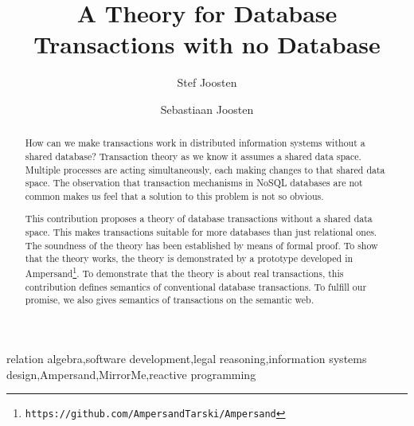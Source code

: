 \documentclass{elsarticle}
\begin{document}
\title{A Theory for Database Transactions with no Database}
\author[ou,ordina]{Stef Joosten}
\author[utwente]{Sebastiaan Joosten}
\address[ou]{Open Universiteit Nederland, Postbus 2960, 6401 DL Heerlen, the Netherlands}
\address[ordina]{Ordina NV, Nieuwegein, the Netherlands}
\address[utwente]{University of Twente, Enschede, the Netherlands}

\begin{abstract}
	How can we make transactions work in distributed information systems without a shared database?
	Transaction theory as we know it assumes a shared data space.
	Multiple processes are acting simultaneously, each making changes to that shared data space.
	The observation that transaction mechanisms in NoSQL databases are not common
	makes us feel that a solution to this problem is not so obvious.

	This contribution proposes a theory of database transactions without a shared data space.
	This makes transactions suitable for more databases than just relational ones.
	The soundness of the theory has been established by means of formal proof.
	To show that the theory works, the theory is demonstrated by a prototype developed in Ampersand\footnote{\tt https://github.com/AmpersandTarski/Ampersand}.
	To demonstrate that the theory is about real transactions, this contribution defines semantics of conventional database transactions.
	To fulfill our promise, we also gives semantics of transactions on the semantic web.
\end{abstract}

\begin{keyword}
relation algebra\sep software development\sep legal reasoning\sep information systems design\sep Ampersand\sep MirrorMe\sep reactive programming
\end{keyword}
\maketitle
\end{document}
